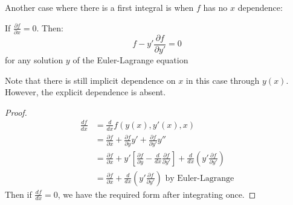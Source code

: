 \documentclass[../Main.tex]{subfiles}
\begin{document}
Another case where there is a first integral is when $f$ has no $x$ dependence:
\begin{proposition}
    If $\frac{\partial f}{\partial x} = 0$. Then:
    \begin{equation}
        f - y' \frac{\partial f}{\partial y'} = 0
        \label{eqnFirstIntegral2}
    \end{equation}
    for any solution $y$ of the Euler-Lagrange equation
    \label{propFirstIntegral}
\end{proposition}
\begin{remark}
    Note that there is still implicit dependence on $x$ in this case through $y(x)$. However, the explicit dependence is absent.
\end{remark}
\begin{proof}
    \begin{align*}
        \frac{df}{dx} &= \frac{d}{dx} f(y(x), y'(x), x) \\
        &= \frac{\partial f}{\partial x} + \frac{\partial f}{\partial y}y' + \frac{\partial f}{\partial y'} y'' \\
        &= \frac{\partial f}{\partial x} + y'\left[\frac{\partial f}{\partial y} - \frac{d}{dx} \frac{\partial f}{\partial y'}\right] + \frac{d}{dx} \left(y' \frac{\partial f}{\partial y'}\right) \\
        &= \frac{\partial f}{\partial x} + \frac{d}{dx} \left(y' \frac{\partial f}{\partial y'}\right) \text{ by Euler-Lagrange}
    \end{align*}
    Then if $\frac{df}{dx} = 0$, we have the required form after integrating once.
\end{proof}
\end{document}
